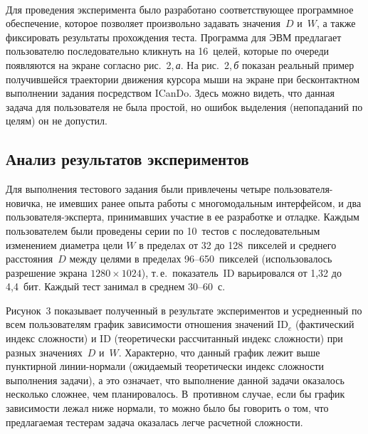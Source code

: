 \begin{multicols}{2}
\begin{figure*} %
 \vspace*{1pt}
 \begin{center}
 \mbox{%
 \epsfxsize=157.675mm
 }
 \end{center}
 \vspace*{-9pt}
\end{figure*}
 
  
  Для проведения эксперимента было разработано соответствующее 
программное обеспечение, которое позволяет произвольно задавать 
значения~$D$ и~$W$, а также фиксировать результаты прохождения теста. 
Программа для ЭВМ предлагает пользователю последовательно кликнуть на 
16~целей, которые по очереди появляются на экране согласно рис.~2,\,\textit{а}. 
На рис.~2,\,\textit{б} показан реальный пример получившейся траектории 
движения курсора мыши на экране при бесконтактном выполнении задания 
посредством ICanDo. Здесь можно видеть, что данная задача для пользователя 
не была простой, но ошибок выделения (непопаданий по целям) он не 
допустил.


\subsection{Анализ результатов экспериментов}

  Для выполнения тестового задания были привлечены четыре пользователя-новичка, не имевших ранее опыта работы с многомодальным интерфейсом, и 
два пользователя-эксперта, принимавших участие в ее разработке и отладке. 
Каждым пользователем были проведены серии по 10~тестов с 
последовательным изменением диаметра цели $W$ в пределах от 32 до 
128~пикселей и среднего расстояния~$D$ между целями в пределах 
  96--650~пикселей (использовалось разрешение экрана $1280\times1024$), 
т.\,е.\ показатель~ID варьировался от 1,32 до 4,4~бит. Каждый тест занимал в 
среднем 30--60~с.
  
  Рисунок~3 показывает полученный в результате экспериментов и 
усредненный по всем пользователям график зависимости отношения значений 
ID$_e$ (фактический индекс сложности) и ID (теоретически рассчитанный 
индекс сложности) при разных значениях~$D$ и~$W$. Характерно, что данный 
график лежит выше пунктирной ли\-нии-нор\-ма\-ли (ожи\-да\-емый теоретически 
индекс сложности выполнения задачи), а это означает, что выполнение данной 
задачи оказалось несколько сложнее, чем планировалось. В~противном случае, 
если бы график зависимости лежал ниже нормали, то можно было бы говорить 
о том, что предлагаемая тестерам задача оказалась легче расчетной сложности.


\end{multicols}
